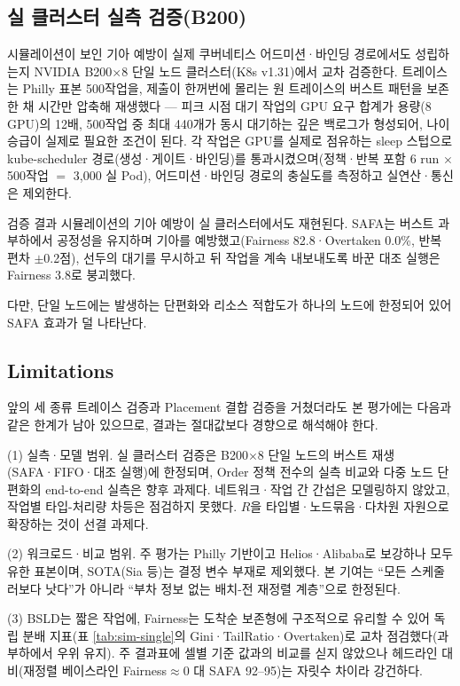 \documentclass{ieeetj}
\begin{document}
\subsection{실 클러스터 실측 검증(B200)}\label{eval:b200}
시뮬레이션이 보인 기아 예방이 실제 쿠버네티스 어드미션·바인딩 경로에서도 성립하는지 NVIDIA B200$\times$8 단일 노드 클러스터(K8s v1.31)에서 교차 검증한다. 트레이스는 Philly 표본 500작업을, 제출이 한꺼번에 몰리는 원 트레이스의 버스트 패턴을 보존한 채 시간만 압축해 재생했다 --- 피크 시점 대기 작업의 GPU 요구 합계가 용량(8 GPU)의 12배, 500작업 중 최대 440개가 동시 대기하는 깊은 백로그가 형성되어, 나이 승급이 실제로 필요한 조건이 된다. 각 작업은 GPU를 실제로 점유하는 sleep 스텁으로  kube-scheduler 경로(생성·게이트·바인딩)를 통과시켰으며(정책·반복 포함 6 run $\times$ 500작업 $=$ 3{,}000 실 Pod), 어드미션·바인딩 경로의 충실도를 측정하고 실연산·통신은 제외한다.

검증 결과 시뮬레이션의 기아 예방이 실 클러스터에서도 재현된다. SAFA는 버스트 과부하에서 공정성을 유지하며 기아를 예방했고(Fairness 82.8·Overtaken 0.0\%, 반복 편차 $\pm$0.2점), 선두의 대기를 무시하고 뒤 작업을 계속 내보내도록 바꾼 대조 실행은 Fairness 3.8로 붕괴했다.

다만, 단일 노드에는 발생하는 단편화와 리소스 적합도가 하나의 노드에 한정되어 있어 SAFA 효과가 덜 나타난다.

\subsection{Limitations}\label{eval:threats}
앞의 세 종류 트레이스 검증과 Placement 결합 검증을 거쳤더라도 본 평가에는 다음과 같은 한계가 남아 있으므로, 결과는 절대값보다 경향으로 해석해야 한다.

(1) 실측·모델 범위. 실 클러스터 검증은 B200$\times$8 단일 노드의 버스트 재생(SAFA·FIFO·대조 실행)에 한정되며, Order 정책 전수의 실측 비교와 다중 노드 단편화의 end-to-end 실측은 향후 과제다. 네트워크·작업 간 간섭은 모델링하지 않았고, 작업별 타입-처리량 차등은 점검하지 못했다. $R$을 타입별·노드묶음·다차원 자원으로 확장하는 것이 선결 과제다.

(2) 워크로드·비교 범위. 주 평가는 Philly 기반이고 Helios·Alibaba로 보강하나 모두 유한 표본이며, SOTA(Sia 등)는 결정 변수 부재로 제외했다. 본 기여는 ``모든 스케줄러보다 낫다''가 아니라 ``부차 정보 없는 배치-전 재정렬 계층''으로 한정된다.

(3) BSLD\cite{feitelson1998metrics}는 짧은 작업에, Fairness는 도착순 보존형에 구조적으로 유리할 수 있어 독립 분배 지표(표 \ref{tab:sim-single}의 Gini·TailRatio·Overtaken)로 교차 점검했다(과부하에서 우위 유지). 주 결과표에 셀별 기준 값과의 비교를 싣지 않았으나 헤드라인 대비(재정렬 베이스라인 Fairness$\approx$0 대 SAFA 92--95)는 자릿수 차이라 강건하다.
\end{document}
